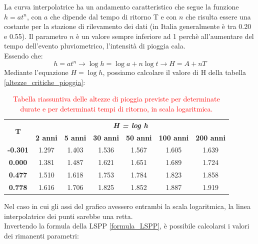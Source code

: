 La curva interpolatrice ha un andamento caratteristico che segue la funzione $h=at^n$, con $a$ che dipende dal tempo di ritorno T e con $n$ che risulta essere una costante per la stazione di rilevamento dei dati (in Italia generalmente è tra 0.20 e 0.55). Il parametro $n$ è un valore sempre inferiore ad 1 perchè all'aumentare del tempo dell'evento pluviometrico, l'intensità di pioggia cala.\\
Essendo che:
\begin{equation}
    h=at^n \rightarrow \log h = \log a + n \log t \rightarrow H=A+nT
    \label{formula_LSPP}
\end{equation}
Mediante l'equazione $H = \log h$, possiamo calcolare il valore di H della tabella \ref{altezze_critiche_pioggia}:

\begin{table}[H] \centering
    \caption{\textcolor{red}{Tabella riassuntiva delle altezze di pioggia previste per determinate durate e per determinati tempi di ritorno, in scala logaritmica.}}
    \begin{tabular}{ccccccc}
        \toprule
    \multirow{2}{*}{\textbf{T}} & \multicolumn{6}{c}{\textit{\textbf{H = log h}}}                                                            \\ & \textbf{2 anni} & \textbf{5 anni} & \textbf{30 anni} & \textbf{50 anni} & \textbf{100 anni} & \textbf{200 anni} \\
    \textbf{-0.301}             & 1.297           & 1.403           & 1.536            & 1.567            & 1.605             & 1.639             \\
    \textbf{0.000}              & 1.381           & 1.487           & 1.621            & 1.651            & 1.689             & 1.724             \\
    \textbf{0.477}              & 1.510           & 1.618           & 1.753            & 1.784            & 1.823             & 1.858             \\
    \textbf{0.778}              & 1.616           & 1.706           & 1.825            & 1.852            & 1.887             & 1.919  \\
    \bottomrule          
    \end{tabular}
    \end{table}
Nel caso in cui gli assi del grafico avessero entrambi la scala logaritmica, la linea interpolatrice dei punti sarebbe una retta.\\
Invertendo la formula della LSPP \ref{formula_LSPP}, è possibile calcolarsi i valori dei rimanenti parametri:
